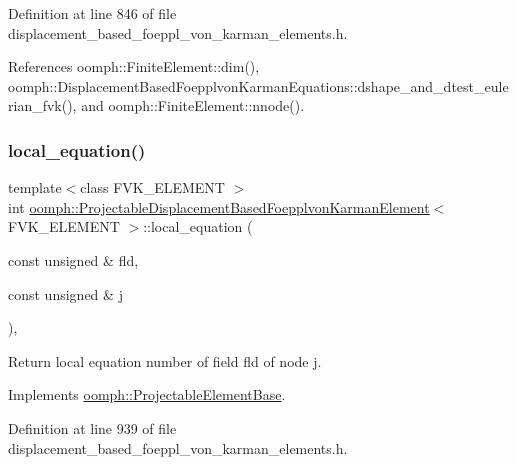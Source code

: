 Definition at line 846 of file displacement\+\_\+based\+\_\+foeppl\+\_\+von\+\_\+karman\+\_\+elements.\+h.



References oomph\+::\+Finite\+Element\+::dim(), oomph\+::\+Displacement\+Based\+Foepplvon\+Karman\+Equations\+::dshape\+\_\+and\+\_\+dtest\+\_\+eulerian\+\_\+fvk(), and oomph\+::\+Finite\+Element\+::nnode().

\mbox{\label{classoomph_1_1ProjectableDisplacementBasedFoepplvonKarmanElement_a165f26b2d0561d8d6e0d8a90f1e6c45d}} 
\subsubsection{\texorpdfstring{local\+\_\+equation()}{local\_equation()}}
{\footnotesize\ttfamily template$<$class F\+V\+K\+\_\+\+E\+L\+E\+M\+E\+NT $>$ \\
int \hyperlink{classoomph_1_1ProjectableDisplacementBasedFoepplvonKarmanElement}{oomph\+::\+Projectable\+Displacement\+Based\+Foepplvon\+Karman\+Element}$<$ F\+V\+K\+\_\+\+E\+L\+E\+M\+E\+NT $>$\+::local\+\_\+equation (\begin{DoxyParamCaption}\item[{const unsigned \&}]{fld,  }\item[{const unsigned \&}]{j }\end{DoxyParamCaption})\hspace{0.3cm}{\ttfamily [inline]}, {\ttfamily [virtual]}}



Return local equation number of field fld of node j. 



Implements \hyperlink{classoomph_1_1ProjectableElementBase_ac5c27ae929ff636dc7747fe23fd4f738}{oomph\+::\+Projectable\+Element\+Base}.



Definition at line 939 of file displacement\+\_\+based\+\_\+foeppl\+\_\+von\+\_\+karman\+\_\+elements.\+h.



